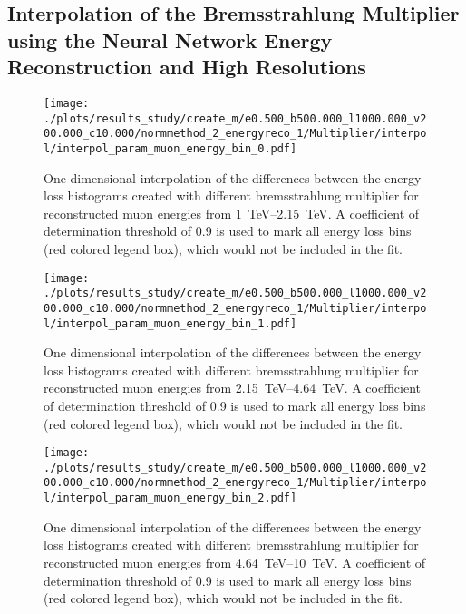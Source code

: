 %

\subsection*{Interpolation of the Bremsstrahlung Multiplier using the Neural Network Energy Reconstruction and High Resolutions}

\begin{figure}[H]
    \centering
    \texttt{[image: ./plots/results\_study/create\_m/e0.500\_b500.000\_l1000.000\_v200.000\_c10.000/normmethod\_2\_energyreco\_1/Multiplier/interpol/interpol\_param\_muon\_energy\_bin\_0.pdf]}
    \caption{One dimensional interpolation of the differences between the energy loss histograms created with different bremsstrahlung multiplier for reconstructed muon energies from \SIrange{1}{2.15}{TeV}. A coefficient of determination threshold of \num{0.9} is used to mark all energy loss bins (red colored legend box), which would not be included in the fit.}
    \label{fig:study_1d_interpol_mu0_nn_high}
\end{figure}

\begin{figure}[H]
    \centering
    \texttt{[image: ./plots/results\_study/create\_m/e0.500\_b500.000\_l1000.000\_v200.000\_c10.000/normmethod\_2\_energyreco\_1/Multiplier/interpol/interpol\_param\_muon\_energy\_bin\_1.pdf]}
    \caption{One dimensional interpolation of the differences between the energy loss histograms created with different bremsstrahlung multiplier for reconstructed muon energies from \SIrange{2.15}{4.64}{TeV}. A coefficient of determination threshold of \num{0.9} is used to mark all energy loss bins (red colored legend box), which would not be included in the fit.}
    \label{fig:study_1d_interpol_mu1_nn_high}
\end{figure}

\begin{figure}[H]
    \centering
    \texttt{[image: ./plots/results\_study/create\_m/e0.500\_b500.000\_l1000.000\_v200.000\_c10.000/normmethod\_2\_energyreco\_1/Multiplier/interpol/interpol\_param\_muon\_energy\_bin\_2.pdf]}
    \caption{One dimensional interpolation of the differences between the energy loss histograms created with different bremsstrahlung multiplier for reconstructed muon energies from \SIrange{4.64}{10}{TeV}. A coefficient of determination threshold of \num{0.9} is used to mark all energy loss bins (red colored legend box), which would not be included in the fit.}
    \label{fig:study_1d_interpol_mu2_nn_high}
\end{figure}

